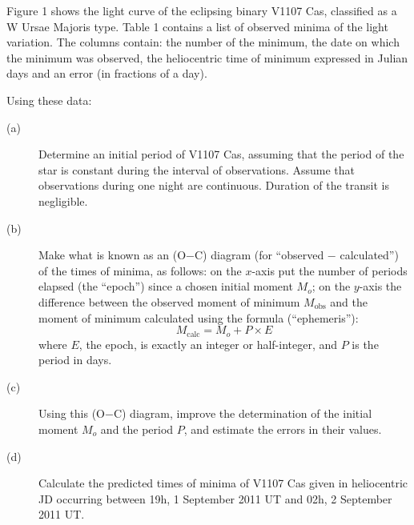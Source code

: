 Figure 1 shows the light curve of the eclipsing binary V1107 Cas, classified
as a W Ursae Majoris type. Table 1 contains a list of observed minima of the
light variation. The columns contain: the number of the minimum, the date on
which the minimum was observed, the heliocentric time of minimum expressed in
Julian days and an error (in fractions of a day).

Using these data:
\begin{description}
\item[(a)] Determine an initial period of V1107 Cas, assuming that the
  period of the star is constant during the interval of observations. Assume
  that observations during one night are continuous. Duration of the transit
  is negligible.
\item[(b)] Make what is known as an (O$-$C) diagram (for ``observed $-$
  calculated'') of the times of minima, as follows: on the $x$-axis put the
  number of periods elapsed (the ``epoch'') since a chosen initial moment
  $M_o$; on the $y$-axis the difference between the observed moment of
  minimum $M_{\mathrm{obs}}$ and the moment of minimum calculated using the
  formula (``ephemeris''):
  \[ M_{\mathrm{calc}} = M_o + P \times E \]
  where $E$, the epoch, is exactly an integer or half-integer, and $P$ is
  the period in days.
\item[(c)] Using this (O$-$C) diagram, improve the determination of the
  initial moment $M_o$ and the period $P$, and estimate the errors in their
  values.
\item[(d)] Calculate the predicted times of minima of V1107 Cas given in
  heliocentric JD occurring between 19h, 1 September 2011 UT and 02h,
  2 September 2011 UT.
\end{description}

